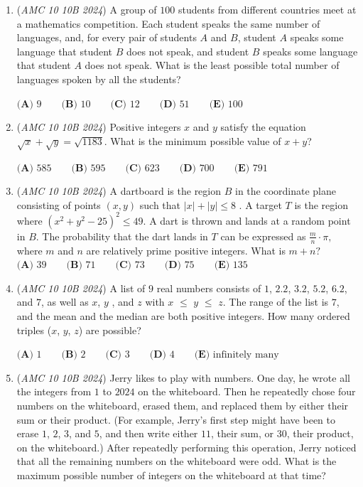 \begin{enumerate}
$\textbf{(A) }13 \qquad \textbf{(B) }14 \qquad \textbf{(C) }15 \qquad \textbf{(D) }16 \qquad \textbf{(E) }17 \qquad$


	\item (\textit{AMC 10 10B 2024}) A group of $100$ students from different countries meet at a mathematics competition.
Each student speaks the same number of languages, and, for every pair of
students $A$ and $B$, student $A$ speaks some language that student $B$ does not speak,
and student $B$ speaks some language that student $A$ does not speak. What is the
least possible total number of languages spoken by all the students?


 $\textbf{(A) } 9 \qquad\textbf{(B) } 10 \qquad\textbf{(C) } 12 \qquad\textbf{(D) } 51 \qquad\textbf{(E) } 100$


	\item (\textit{AMC 10 10B 2024}) Positive integers $x$ and $y$ satisfy the equation $\sqrt{x} + \sqrt{y} = \sqrt{1183}$. What is the minimum possible value of $x+y$?


 $\textbf{(A) } 585 \qquad\textbf{(B) } 595 \qquad\textbf{(C) } 623 \qquad\textbf{(D) } 700 \qquad\textbf{(E) } 791$


	\item (\textit{AMC 10 10B 2024}) A dartboard is the region $B$ in the coordinate plane consisting of points $(x,y)$ such
that $|x| + |y| \le 8$ . A target $T$ is the region where $(x^2 + y^2 - 25)^2 \le 49.$ A dart is
thrown and lands at a random point in $B$. The probability that the dart lands in $T$ can be
expressed as $\frac{m}{n} \cdot \pi,$ where $m$ and $n$ are relatively prime positive integers. What
is $m + n?$
$\textbf{(A) } 39 \qquad\textbf{(B) } 71 \qquad\textbf{(C) } 73 \qquad\textbf{(D) } 75 \qquad\textbf{(E) } 135$


	\item (\textit{AMC 10 10B 2024}) A list of $9$ real numbers consists of $1$, $2.2$, $3.2$, $5.2$, $6.2$, and $7$, as well as $x$, $y$ , and $z$ with $x$ $\le$ $y$ $\le$ $z$. The range of the list is $7$, and the mean and the median are both positive integers. How many ordered triples ($x$, $y$, $z$) are possible?


 $\textbf{(A) } 1 \qquad \textbf{(B) } 2 \qquad \textbf{(C) } 3 \qquad \textbf{(D) } 4 \qquad \textbf{(E) } \text{infinitely many}$


	\item (\textit{AMC 10 10B 2024}) Jerry likes to play with numbers. One day, he wrote all the integers from $1$ to $2024$ on the whiteboard. Then he repeatedly chose four numbers on the whiteboard, erased them, and replaced them by either their sum or their product. (For example, Jerry's first step might have been to erase $1$, $2$, $3$, and $5$, and then write either $11$, their sum, or $30$, their product, on the whiteboard.) After repeatedly performing this operation, Jerry noticed that all the remaining numbers on the whiteboard were odd. What is the maximum possible number of integers on the whiteboard at that time?



\end{enumerate}
